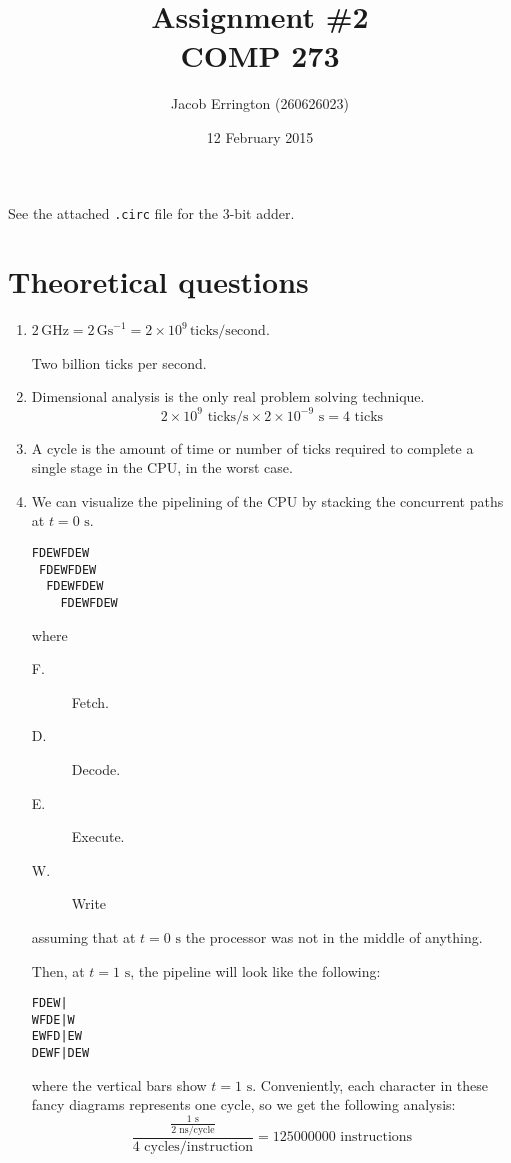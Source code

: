 \documentclass{article}
\author{Jacob Errington (260626023)}
\date{12 February 2015}
\title{Assignment \#2\\COMP 273}
\newcommand{\E}[1]{\times 10^{#1}}
\begin{document}
\maketitle

See the attached \texttt{.circ} file for the 3-bit adder.

\section*{Theoretical questions}

\begin{enumerate}
    \item $2\,\mathrm{GHz} = 2\,\mathrm{Gs}^{-1} = 2\E{9}\,\text{ticks/second}$.

        Two billion ticks per second.

    \item Dimensional analysis is the only real problem solving technique.
        $$ 2\E{9} \text{ ticks/s} \times 2\E{-9} \text{ s} = 4 \text{ ticks} $$

    \item A cycle is the amount of time or number of ticks required to complete
        a single stage in the CPU, in the worst case.

    \item We can visualize the pipelining of the CPU by stacking the concurrent
        paths at $t=0\text{ s}$.

\begin{verbatim}
FDEWFDEW
 FDEWFDEW
  FDEWFDEW
    FDEWFDEW
\end{verbatim}
        where
        \begin{description}
            \item[F.] Fetch.
            \item[D.] Decode.
            \item[E.] Execute.
            \item[W.] Write
        \end{description}
        assuming that at $t=0 \text{ s}$ the processor was not in the middle of anything.

        Then, at $t=1\text{ s}$, the pipeline will look like the following:

\begin{verbatim}
FDEW|
WFDE|W
EWFD|EW
DEWF|DEW
\end{verbatim}

        where the vertical bars show $t=1\text{ s}$. Conveniently, each
        character in these fancy diagrams represents one cycle, so we get the following analysis:
        \begin{equation*}
            \frac{\frac{1\text{ s}}{2 \text{ ns/cycle}}}{4\text{ cycles/instruction}} 
                =  125 000 000\text{ instructions}
        \end{equation*}


\end{enumerate}
\end{document}
